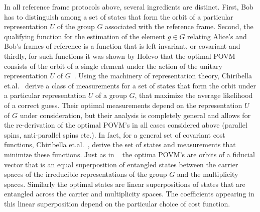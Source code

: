 \documentclass{article}
\begin{document}
In all reference frame protocols above, several ingredients are distinct.  First, Bob has to distinguish among a set of states that form the orbit of a particular representation $U$ of the group $G$ associated with the reference frame.  Second, the qualifying function for the estimation of the element $g\in G$ relating Alice's and Bob's frames of reference is a function that is left invariant, or covariant and thirdly, for such functions it was shown by Holevo that the optimal POVM consists of the orbit of a single element under the action of the unitary representation $U$ of $G$~\cite{H80}.  Using the machinery of representation theory, Chiribella et.al.~\cite{CDPS04b} derive a class of measurements for a set of states that form the orbit under a particular representation $U$ of a group $G$, that maximize the average likelihood of a correct guess. Their optimal measurements depend on the representation $U$ of $G$ under consideration, but their analysis is completely general and allows for the re-derivation of the optimal POVM's in all cases considered above (parallel spins, anti-parallel spins etc.).  In fact, for a general set of covariant cost functions, Chiribella et.al.~\cite{CDS05}, derive the set of states and measurements that minimize these functions.  Just as in ~\cite{CDPS04b} the optima POVM's are orbits of a fiducial vector that is an equal superposition of entangled states between the carrier spaces of the irreducible representations of the group $G$ and the multiplicity spaces.  Similarly the optimal states are linear superpositions of states that are entangled across the carrier and multiplicity spaces.  The coefficients appearing in this linear superposition depend on the particular choice of cost function.
\end{document}
